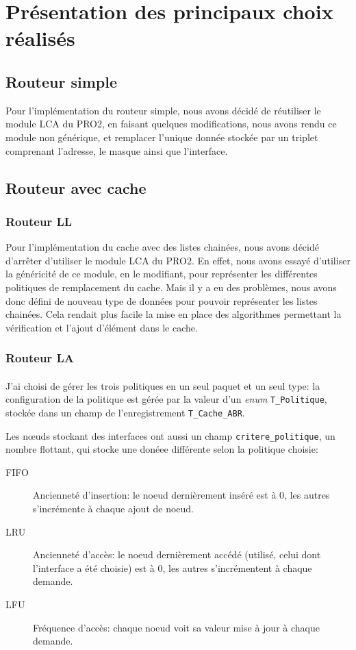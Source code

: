 \documentclass{article}
\begin{document}
\section{Présentation des principaux choix réalisés}

\subsection{Routeur simple}
Pour l'implémentation du routeur simple, nous avons décidé de réutiliser le module LCA du PRO2, en faisant quelques modifications, nous avons rendu ce module non générique, et remplacer l'unique donnée stockée par un triplet comprenant l'adresse, le masque ainsi que l'interface.

\subsection{Routeur avec cache}
\subsubsection{Routeur LL}
Pour l'implémentation du cache avec des listes chainées, nous avons décidé d'arrêter d'utiliser le module LCA du PRO2. En effet, nous avons essayé d'utiliser la généricité de ce module, en le modifiant, pour représenter les différentes politiques de remplacement du cache. Mais il y a eu des problèmes, nous avons donc défini de nouveau type de données pour pouvoir représenter les listes chainées. Cela rendait plus facile la mise en place des algorithmes permettant la vérification et l'ajout d'élément dans le cache.

\subsubsection{Routeur LA}
\paragraph{}
J'ai choisi de gérer les trois politiques en un seul paquet et un seul type: la configuration de la politique est gérée par la valeur d'un \emph{enum} \verb|T_Politique|, stockée dans un champ de l'enregistrement \verb|T_Cache_ABR|.

Les nœuds stockant des interfaces ont aussi un champ \verb|critere_politique|, un nombre flottant, qui stocke une donéee différente selon la politique choisie:

\begin{description}
\item[FIFO] Ancienneté d'insertion: le noeud dernièrement inséré est à 0, les autres s'incrémente à chaque ajout de noeud.
\item[LRU] Ancienneté d'accès: le noeud dernièrement accédé (utilisé, celui dont l'interface a été choisie) est à 0, les autres s'incrémentent à chaque demande.
\item[LFU] Fréquence d'accès: chaque noeud voit sa valeur mise à jour à chaque demande.
\end{description}
\end{document}
